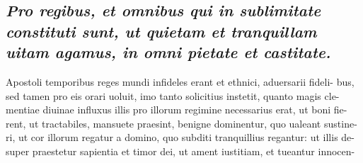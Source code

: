 \documentclass{article}
\begin{document}
\begin{pages}
{}
\subsection*{\textit{Pro regibus, et omnibus qui in sublimitate constituti sunt, ut quietam et tranquillam uitam agamus, in omni pietate et castitate. }}\pstart Apostoli temporibus reges mundi infideles erant et ethnici, aduersarii fideli- bus, sed tamen pro eis orari uoluit, imo tanto solicitius instetit, quanto magis cle- mentiae diuinae influxus illis pro illorum regimine necessarius erat, ut boni fie- rent, ut tractabiles, mansuete praesint, benigne dominentur, quo ualeant sustine- ri, ut cor illorum regatur a domino, quo subditi tranquillius regantur: ut illis de- super praestetur sapientia et timor dei, ut ament iustitiam, et tueantur innocen-  \pend

\end{pages}
\end{document}
